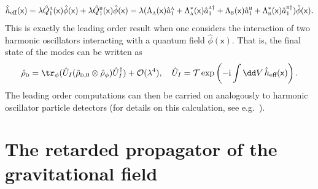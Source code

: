 \documentclass[letterpaper,12pt,titlepage,oneside,final]{book}
\newcommand{\mf}{\mathsf}%
\newcommand{\ii}{\mathrm{i}}
\newcommand{\tc}[1]{\textsc{#1}}
\begin{document}
{\begin{equation}
    \hat{h}_\text{eff}(\mf x) = \lambda \hat{Q}_1^{\tc{a}}(\mf x) \hat{\phi}(\mf x) +\lambda \hat{Q}_1^{\tc{b}}(\mf x) \hat{\phi}(\mf x)  = \lambda(\Lambda_\tc{a}(\mf x) \hat{a}^{\tc{a}}_1+\Lambda^*_\tc{a}(\mf x) \hat{a}^{\tc{a}\dagger}_1 + \Lambda_\tc{b}(\mf x) \hat{a}^{\tc{b}}_1+\Lambda^*_\tc{b}(\mf x) \hat{a}^{\tc{b}\dagger}_1)\hat{\phi}(\mf x).
\end{equation}
This is exactly the leading order result when one considers the interaction of two harmonic oscillators interacting with a quantum field $\hat{\phi}(\mf x)$. That is, the final state of the modes can be written as
\begin{equation}
    \hat{\rho}_\tc{d} = \tr_\phi(\hat{U}_I (\hat{\rho}_{\tc{d},0} \otimes \hat{\rho}_\phi )\hat{U}_I^\dagger) + \mathcal{O}(\lambda^4), \quad \hat{U}_I = \mathcal{T}\exp\left(-\ii \int \dd V \, \hat{h}_\text{eff}(\mf x)\right).
\end{equation}
The leading order computations can then be carried on analogously to harmonic oscillator particle detectors (for details on this calculation, see e.g.~\cite{EricksonZero}). 



\chapter{The retarded propagator of the gravitational field}\label{app:retGrav}


}
\end{document}
